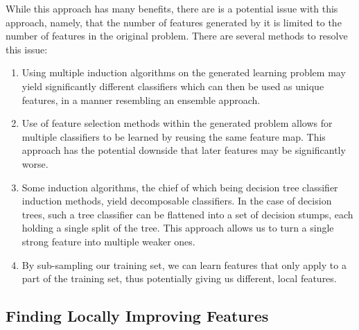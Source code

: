 \documentclass[twoside,11pt]{article}
\theoremstyle{definition}
\begin{document}
While this approach has many benefits, there are is a potential issue with this approach, namely, that the number of features generated by it is limited to the number of features in the original problem. There are several methods to resolve this issue:
\begin{enumerate}
	\item Using multiple induction algorithms on the generated learning problem may yield significantly different classifiers which can then be used as unique features, in a manner resembling an ensemble approach.
	\item Use of feature selection methods within the generated problem allows for multiple classifiers to be learned by reusing the same feature map. This approach has the potential downside that later features may be significantly worse.
	\item Some induction algorithms, the chief of which being decision tree classifier induction methods, yield decomposable classifiers. In the case of decision trees, such a tree classifier can be flattened into a set of decision stumps, each holding a single split of the tree. This approach allows us to turn a single strong feature into multiple weaker ones.
	\item By sub-sampling our training set, we can learn features that only apply to a part of the training set, thus potentially giving us different, local features.
\end{enumerate}

\subsection{Finding Locally Improving Features} \label{tree_usage}
\end{document}
